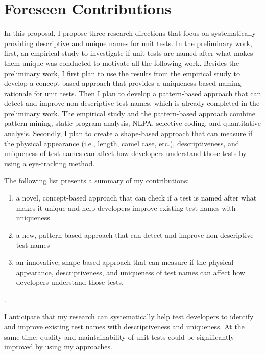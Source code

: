 \section{Foreseen Contributions}
\label{sec:contributions}

In this proposal, I propose three research directions that focus on systematically providing descriptive and unique names for unit tests.
%
In the preliminary work, first, an empirical study to investigate if unit tests are named after what makes them unique was conducted to motivate all the following work.
%
Besides the preliminary work, I first plan to use the results from the empirical study to develop a concept-based approach that provides a uniqueness-based naming rationale for unit tests.
%
Then I plan to develop a pattern-based approach that can detect and improve non-descriptive test names, which is already completed in the preliminary work.
%
The empirical study and the pattern-based approach combine pattern mining, static program analysis, NLPA, selective coding, and quantitative analysis. 
%
Secondly, I plan to create a shape-based approach that can measure if the physical appearance (i.e., length, camel case, etc.), descriptiveness, and uniqueness of test names can affect how developers understand those tests by using a eye-tracking method.

The following list presents a summary of my contributions:
\begin{enumerate}
    \item a novel, concept-based approach that can check if a test is named after what makes it unique and help developers improve existing test names with uniqueness
    \item a new, pattern-based approach that can detect and improve non-descriptive test names
    \item an innovative, shape-based approach that can measure if the physical appearance, descriptiveness, and uniqueness of test names can affect how developers understand those tests.
\end{enumerate}.

I anticipate that my research can systematically help test developers to identify and improve existing test names with descriptiveness and uniqueness.
%
At the same time, quality and maintainability of unit tests could be significantly improved by using my approaches.